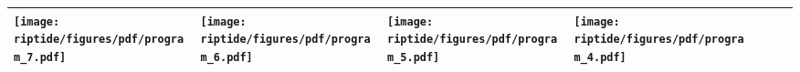 {\begin{table*}[t]
{\begin{tabular}{p{0.35in}P{1.25in}P{1.25in}P{1.25in}P{1.25in}P{1.25in}P{1.35in}}
			\texttt{[image: riptide/figures/pdf/program\_7.pdf]} &
			\texttt{[image: riptide/figures/pdf/program\_6.pdf]} &
			\texttt{[image: riptide/figures/pdf/program\_5.pdf]} &
			\texttt{[image: riptide/figures/pdf/program\_4.pdf]} \\
			\bottomrule
		\end{tabular}
	}
\end{table*}
}

\newcommand{\figRipTideLSOResults}{
\begin{figure}[htb]
	\centering
	\texttt{[image: riptide/figures/pdf/lso-graph-crop.pdf]}
	\caption{}
	\label{fig:eval:fin}
\end{figure}
}

